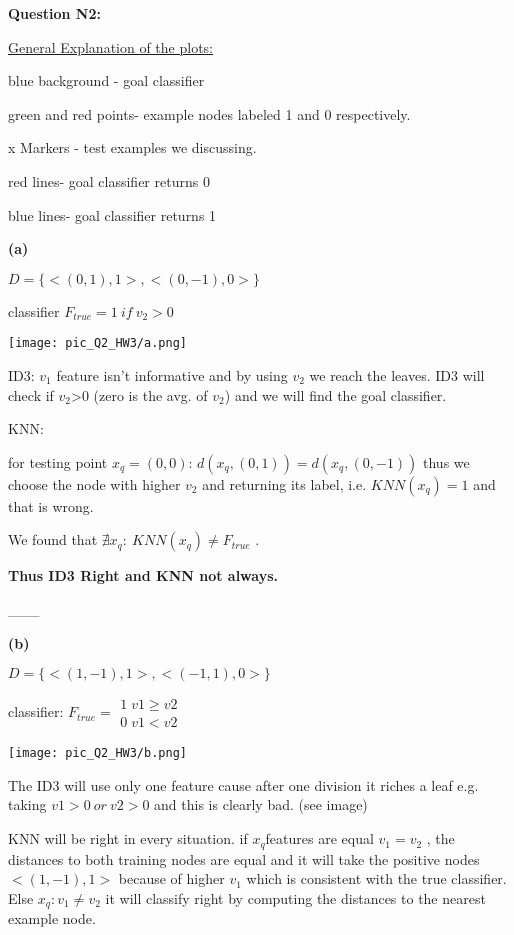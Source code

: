 \textbf{Question N2:}

\uline{General Explanation of the plots:}

blue background - goal classifier

green and red points- example nodes labeled 1 and 0 respectively.

x Markers - test examples we discussing.

red lines- goal classifier returns 0

blue lines- goal classifier returns 1

\textbf{(a)}

$D=\{<(0,1),1>,<(0,-1),0>\}$

classifier $F_{true}=1\ if\ v_{2}>0$

\texttt{[image: pic\_Q2\_HW3/a.png]}

ID3: $v_{1}$ feature isn't informative and by using $v_{2}$ we reach
the leaves. ID3 will check if $v_{2}$>0 (zero is the avg. of $v_{2}$)
and we will find the goal classifier.

KNN:

for testing point $x_{q}=(0,0)$: $d(x_{q},(0,1))=d(x_{q},(0,-1))$
thus we choose the node with higher $v_{2}$ and returning its label,
i.e. $KNN(x_{q})=1$ and that is wrong.

We found that $\nexists x_{q}:\ KNN(x_{q})\neq F_{true}$ .

\textbf{Thus ID3 Right and KNN not always.}

\_\_\_

\textbf{(b)}

$D=\{<(1,-1),1>,<(-1,1),0>\}$

classifier: $F_{true}=\begin{array}{c}
1\;v1\geq v2\\
0\;v1<v2
\end{array}$

\texttt{[image: pic\_Q2\_HW3/b.png]}

The ID3 will use only one feature cause after one division it riches
a leaf e.g. taking $v1>0\ or\ v2>0$ and this is clearly bad. (see
image)

KNN will be right in every situation. if $x_{q}$features are equal
$v_{1}=v_{2}$ , the distances to both training nodes are equal and
it will take the positive nodes $<(1,-1),1>$ because of higher $v_{1}$
which is consistent with the true classifier. Else $x_{q}:v_{1}\neq v_{2}$
it will classify right by computing the distances to the nearest example
node.

